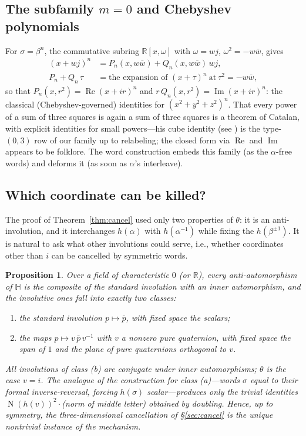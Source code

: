 \documentclass[11pt]{article}
\newtheorem{proposition}[theorem]{Proposition}
\theoremstyle{definition}
\theoremstyle{remark}
\newcommand{\HH}{\mathbb{H}}
\newcommand{\RR}{\mathbb{R}}
\newcommand{\bw}{\bar{w}}
\DeclareMathOperator{\N}{N}
\begin{document}
\subsection{The subfamily $m=0$ and Chebyshev polynomials}
For $\sigma=\beta^n$, the commutative subring $\RR[x,\omega]$ with $\omega=wj$, $\omega^2=-w\bw$, gives
\begin{align*}
(x+wj)^n&=P_n(x,w\bw)+Q_n(x,w\bw)\,wj,\\
P_n+Q_n\,\tau&=\text{the expansion of }(x+\tau)^n\ \text{at}\ \tau^2=-w\bw,
\end{align*}
so that $P_n(x,r^2)=\operatorname{Re}(x+ir)^n$ and $r\,Q_n(x,r^2)=\operatorname{Im}(x+ir)^n$: the classical (Chebyshev-governed) identities for $(x^2+y^2+z^2)^n$. That every power of a sum of three squares is again a sum of three squares is a theorem of Catalan, with explicit identities for small powers---his cube identity (see \cite[Ch.~VII, pp.~267--268]{Dickson}) is the type-$(0,3)$ row of our family up to relabeling; the closed form via $\operatorname{Re}$ and $\operatorname{Im}$ appears to be folklore. The word construction embeds this family (as the $\alpha$-free words) and deforms it (as soon as $\alpha$'s interleave).

\subsection{Which coordinate can be killed?}\label{subsec:classify}
The proof of Theorem~\ref{thm:cancel} used only two properties of $\theta$: it is an anti-involution, and it interchanges $h(\alpha)$ with $h(\alpha^{-1})$ while fixing the $h(\beta^{\pm1})$. It is natural to ask what other involutions could serve, i.e., whether coordinates other than $i$ can be cancelled by symmetric words.

\begin{proposition}\label{prop:classify}
Over a field of characteristic $0$ (or $\RR$), every anti-automorphism of $\HH$ is the composite of the standard involution with an inner automorphism, and the involutive ones fall into exactly two classes:
\begin{enumerate}
\item[(a)] the standard involution $p\mapsto\bar p$, with fixed space the scalars;
\item[(b)] the maps $p\mapsto v\,\bar p\,v^{-1}$ with $v$ a nonzero pure quaternion, with fixed space the span of $1$ and the plane of pure quaternions orthogonal to $v$.
\end{enumerate}
All involutions of class (b) are conjugate under inner automorphisms; $\theta$ is the case $v=i$. The analogue of the construction for class (a)---words $\sigma$ equal to their formal inverse-reversal, forcing $h(\sigma)$ scalar---produces only the trivial identities $\N(h(v))^2\cdot$(norm of middle letter) obtained by doubling. Hence, up to symmetry, the three-dimensional cancellation of \S\ref{sec:cancel} is the unique nontrivial instance of the mechanism.
\end{proposition}
\end{document}
